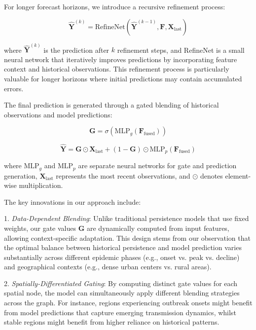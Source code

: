 \documentclass[lettersize, journal]{IEEEtran}
\begin{document}
For longer forecast horizons, we introduce a recursive refinement process:

\begin{equation}
\hat{\mathbf{Y}}^{(k)} = \text{RefineNet}(\hat{\mathbf{Y}}^{(k-1)}, \mathbf{F}, \mathbf{X}_{\text{last}})
\end{equation}

where $\hat{\mathbf{Y}}^{(k)}$ is the prediction after $k$ refinement steps, and RefineNet is a small neural network that iteratively improves predictions by incorporating feature context and historical observations. This refinement process is particularly valuable for longer horizons where initial predictions may contain accumulated errors.

The final prediction is generated through a gated blending of historical observations and model predictions:

\begin{equation}
\mathbf{G} = \sigma(\text{MLP}_g(\mathbf{F}_{\text{fused}}))
\end{equation}

\begin{equation}
\hat{\mathbf{Y}} = \mathbf{G} \odot \mathbf{X}_{\text{last}} + (1 - \mathbf{G}) \odot \text{MLP}_p(\mathbf{F}_{\text{fused}})
\end{equation}

where $\text{MLP}_g$ and $\text{MLP}_p$ are separate neural networks for gate and prediction generation, $\mathbf{X}_{\text{last}}$ represents the most recent observations, and $\odot$ denotes element-wise multiplication. 

The key innovations in our approach include:

1. \textit{Data-Dependent Blending}: Unlike traditional persistence models that use fixed weights, our gate values $\mathbf{G}$ are dynamically computed from input features, allowing context-specific adaptation. This design stems from our observation that the optimal balance between historical persistence and model prediction varies substantially across different epidemic phases (e.g., onset vs. peak vs. decline) and geographical contexts (e.g., dense urban centers vs. rural areas).

2. \textit{Spatially-Differentiated Gating}: By computing distinct gate values for each spatial node, the model can simultaneously apply different blending strategies across the graph. For instance, regions experiencing outbreak onsets might benefit from model predictions that capture emerging transmission dynamics, whilst stable regions might benefit from higher reliance on historical patterns.
\end{document}
